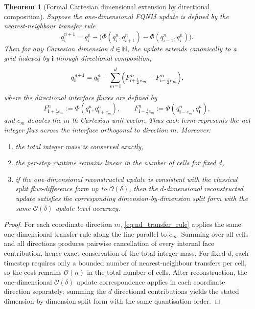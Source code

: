 \documentclass[sn-basic]{sn-jnl}
\theoremstyle{plain}
\newtheorem{theorem}{Theorem}[section]
\theoremstyle{remark}
\begin{document}
%
\begin{theorem}[Formal Cartesian dimensional extension by directional composition]
\label{thm:dimension_extension}
Suppose the one-dimensional FQNM update is defined by the nearest-neighbour transfer rule
\begin{equation}
q_i^{n+1}=q_i^n-\bigl(\Phi(q_i^n,q_{i+1}^n)-\Phi(q_{i-1}^n,q_i^n)\bigr).
\label{eq:oned_transfer_rule}
\end{equation}
Then for any Cartesian dimension $d\in\mathbb N$, the update extends canonically to a grid indexed by $\mathbf i$ through directional composition,
\begin{equation}
q_{\mathbf i}^{n+1}
=
q_{\mathbf i}^n
-
\sum_{m=1}^d
\Bigl(
F_{\mathbf i+\frac12 e_m}^n - F_{\mathbf i-\frac12 e_m}^n
\Bigr),
\label{eq:nd_transfer_rule}
\end{equation}
where the directional interface fluxes are defined by
\begin{equation}
F_{\mathbf i+\frac12 e_m}^n := \Phi(q_{\mathbf i}^n, q_{\mathbf i+e_m}^n),
\qquad
F_{\mathbf i-\frac12 e_m}^n := \Phi(q_{\mathbf i-e_m}^n, q_{\mathbf i}^n),
\label{eq:nd_flux_definition}
\end{equation}
and $e_m$ denotes the $m$-th Cartesian unit vector. Thus each term represents the net integer flux across the interface orthogonal to direction $m$.
Moreover:
\begin{enumerate}[label=(\roman*)]
\item the total integer mass is conserved exactly,
\item the per-step runtime remains linear in the number of cells for fixed $d$,
\item if the one-dimensional reconstructed update is consistent with the classical split flux-difference form up to $\mathcal O(\delta)$, then the $d$-dimensional reconstructed update satisfies the corresponding dimension-by-dimension split form with the same $\mathcal O(\delta)$ update-level accuracy.
\end{enumerate}
\end{theorem}

\begin{proof}
For each coordinate direction $m$, \cref{eq:nd_transfer_rule} applies the same one-dimensional transfer rule along the line parallel to $e_m$. Summing over all cells and all directions produces pairwise cancellation of every internal face contribution, hence exact conservation of the total integer mass. For fixed $d$, each timestep requires only a bounded number of nearest-neighbour transfers per cell, so the cost remains $\mathcal O(n)$ in the total number of cells. After reconstruction, the one-dimensional $\mathcal O(\delta)$ update correspondence applies in each coordinate direction separately; summing the $d$ directional contributions yields the stated dimension-by-dimension split form with the same quantisation order.
\end{proof}
\end{document}
